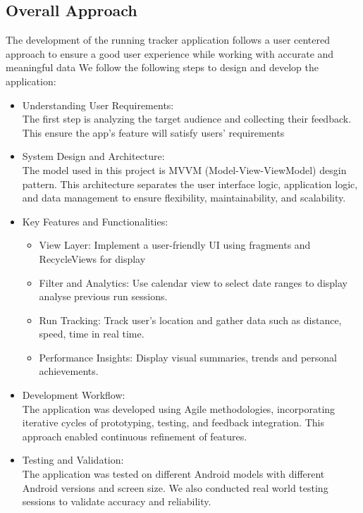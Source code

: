 \documentclass{article}
\begin{document}
\subsection{Overall Approach}

    The development of the running tracker application follows a user
centered approach to ensure a good user experience while working
 with accurate and meaningful data
    We follow the following steps to design and develop the application:
    \begin{itemize}
        \item Understanding User Requirements:\\
        The first step is analyzing the target audience and collecting their feedback. This ensure the app's feature will satisfy users' requirements
        \item System Design and Architecture:\\
        The model used in this project is MVVM (Model-View-ViewModel) desgin pattern. This architecture separates the user interface logic, application logic, and data management to ensure flexibility, maintainability, and scalability.
        \item Key Features and Functionalities:\\
        \begin{itemize}
            \item View Layer: Implement a user-friendly UI using fragments and RecycleViews for display
            \item Filter and Analytics: Use calendar view to select date ranges to display analyse previous run sessions.
            \item Run Tracking: Track user's location and gather data such as distance, speed, time in real time.
            \item Performance Insights: Display visual summaries, trends and personal achievements.
        \end{itemize}
        \item Development Workflow:\\
        The application was developed using Agile methodologies, incorporating iterative cycles of prototyping, testing, and feedback integration. This approach enabled continuous refinement of features.
        \item Testing and Validation:\\
        The application was tested on different Android models with different Android versions and screen size. We also conducted real world testing sessions to validate accuracy and reliability.
    \end{itemize}
        
\end{document}
